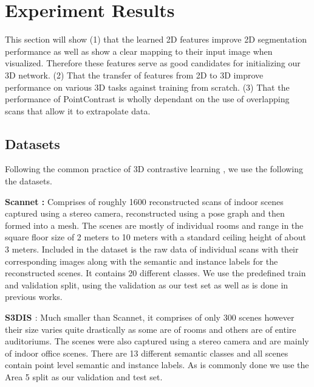 \documentclass[10pt,twocolumn,letterpaper]{article}
\begin{document}

\section{Experiment Results}
\label{sec:results}

This section will show (1) that the learned 2D features improve 2D segmentation performance as well as show a clear mapping to their input image when visualized. Therefore these features serve as good candidates for initializing our 3D network. (2) That the transfer of features from 2D to 3D improve performance on various 3D tasks against training from scratch. (3) That the performance of PointContrast is wholly dependant on the use of overlapping scans that allow it to extrapolate data.

\subsection{Datasets}
\label{sec:results:datasets}

Following the common practice of 3D contrastive learning \cite{xie2020pointcontrast,hou2021Exploring, zhang2021Self, jiang2021Guided}, we use the following the datasets.

\textbf{Scannet \cite{Dai2017ScanNet}:} Comprises of roughly 1600 reconstructed scans of indoor scenes captured using a stereo camera, reconstructed using a pose graph and then formed into a mesh. The scenes are mostly of individual rooms and range in the square floor size of 2 meters to 10 meters with a standard ceiling height of about 3 meters. Included in the dataset is the raw data of individual scans with their corresponding images along with the semantic and instance labels for the reconstructed scenes. It contains 20 different classes. We use the predefined train and validation split, using the validation as our test set as well as is done in previous works.

\textbf{S3DIS \cite{armeni20163D}}: Much smaller than Scannet, it comprises of only 300 scenes however their size varies quite drastically as some are of rooms and others are of entire auditoriums. The scenes were also captured using a stereo camera and are mainly of indoor office scenes. There are 13 different semantic classes and all scenes contain point level semantic and instance labels. As is commonly done \cite{xie2020pointcontrast, hou2021Exploring} we use the Area 5 split as our validation and test set.
\end{document}
